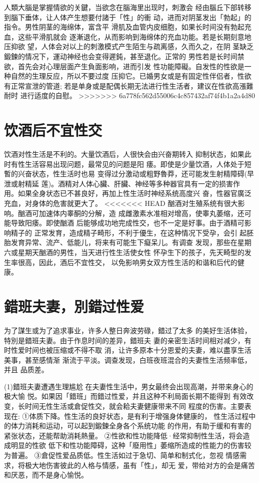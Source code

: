 \documentclass[12pt,UTF8]{ctexbook}
\begin{document}
人類大腦是掌握情欲的关鍵，当欲念在腦海里出现时，刺激会
经由腦丘下部转移到腦下垂体，让人体产生想要付諸于「性」的衝
动，进而对阴茎发出「勃起」的指令。男性阴茎的海绵体，富含平
滑肌及血管内皮细胞，如果长时间没有勃起充血，这些平滑肌就会
逐漸退化，从而影响到海绵体的充血功能。若是长期刻意地压抑欲
望，人体会对以上的刺激模式产生陌生与疏离感，久而久之，在阴
茎缺乏鍛鍊的情况下，運动神经也会变得遲鈍，甚至退化。正常的
男性若是长时间禁欲，首先会对心理层面产生負面影响，进而引发
性功能障礙。自发性的性欲是一种自然的生理反应，所以不要过度
压抑它。已婚男女或是有固定性伴侣者，性欲有正常宣泄的管道;
若是单身或是配偶长期无法进行性生活者，建议在性欲高漲難耐时
进行适度的自慰。
>>>>>>> 6a778fc562d55006c4c857432af74f4b1a2a4d80

\section{饮酒后不宜性交}

饮酒对性生活是不利的。大量饮酒后，人很快会由兴奋期转入
抑制状态，如果此时有性生活容易出现问题，最常见的问题是阳
痿。即使是少量饮酒，人体处于短暫的兴奋状态，性生活时也易
变得过分激动或粗野魯莽，还可能发生射精障碍(早泄或射精延
莲)。酒精对人体心臟、肝臟、神经等多种器官具有一定的损害作
用。如果全身状态已不甚良好，再加上性生活时神经系统高度兴
奋，性器官廣泛充血，对身体的危害就更大了。
<<<<<<< HEAD
酗酒对生殖系统有很大影响。酗酒可加速体内睾酮的分解，造
成雌激素水准相对增高，使睾丸萎缩，还可能导致阳痿。即使酗酒
后能够成功地完成性交，也不一定是好事。由于酒精可影响精子的
正常发育，造成精子畸形，不利于優生，在这种情况下受孕，会引
起胚胎发育异常、流产、低能儿，将来有可能生下癡呆儿。有调查
发现，那些在星期六或星期天酗酒的男性，当天进行性生活使女性
怀孕生下的孩子，先天畸型的发生率很高，因此，酒后不宜性交，
以免影响男女双方性生活的和谐和后代的健康。

\section{錯班夫妻，別錯过性爱}

为了謀生或为了追求事业，许多人整日奔波劳碌，錯过了太多
的美好生活体验，特別是錯班夫妻。由于作息时间的差异，錯班夫
妻的亲密生活时间相对减少，有时性爱时间也被压缩或不得不取
消，让许多原本十分恩爱的夫妻，难以盡享生活美事，甚至感情渐
渐流于平淡。调查发现，白班夜班混合的夫妻性生活频率低，并且
品质差。

(1)錯班夫妻遭遇生理尴尬
在夫妻性生活中，男女最终会出现高潮，并带来身心的极大愉
悦。如果因「錯班」而錯过性爱，并且这种不利局面长期不能得到
有效改变，长时间无性生活或倉促性交，就会耠夫妻健康带来不同
程度的伤害。主要表现在:
①体质下降。性生活的良好状态，是有利于增强身体健康的，
性生活过程中的体力消耗和运动，可以起到鍛鍊全身各个系统功能
的作用，有助于缓和有害的紧张状态，还能帮助消耗熱量。
②性欲和性功能降低·经常抑制性生活，将会造成明显的性欲
低下和性功能障碍，这种「廢用性」萎缩所造成的性能力的伤害较
为普遍。
③倉促性爱品质低。性生活如过于急切、简单和制式化，忽视
情感需求，将极大地伤害彼此的人格与情感，虽有「性」，却无
爱，带给对方的会是痛苦和厌恶，而不是身心愉悦。
\end{document}
